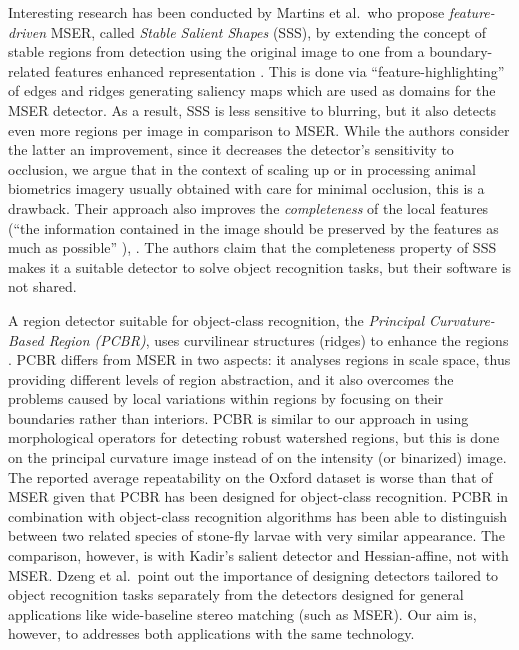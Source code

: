 \documentclass[conference,compsoc]{IEEEtran}
\begin{document}
Interesting research has been conducted by Martins et al.~who propose {\em feature-driven} MSER, called  {\em Stable Salient Shapes} (SSS), by extending the concept of stable regions from detection using the original image to one from a boundary-related features enhanced representation \cite{MartinsVisapp12, Martins12}. This is done via ``feature-highlighting'' of edges and ridges generating saliency maps which are used as domains for the MSER detector. As a result, SSS is less sensitive to blurring, but it also detects even more regions per image in comparison to MSER. While the authors consider the latter an improvement, since it decreases the detector's sensitivity to occlusion, we argue that in the context of scaling up or in processing animal biometrics imagery usually obtained with care for minimal occlusion, this is a drawback. Their approach also improves the {\em completeness} of the local features (``the information contained in the image should be preserved by the features as much as possible'' \cite{Dickscheid2011}), \cite{Martins2016OnTC}. The authors claim that the completeness property of SSS makes it a suitable detector to solve object recognition tasks, but their software is not shared.

A region detector suitable for object-class recognition, the {\em Principal Curvature-Based Region (PCBR)}, uses curvilinear structures (ridges) to enhance the regions \cite{DengZMDS07}. PCBR differs from MSER in two aspects: it analyses regions in scale space, thus providing different levels of region abstraction, and it also overcomes the problems caused by local variations within regions by focusing on their boundaries rather than interiors. PCBR is similar to our approach in using morphological operators for detecting robust watershed regions, but this is done on the principal curvature image instead of on the intensity (or binarized) image. The reported average repeatability on the Oxford dataset is worse than that of MSER given that PCBR has been designed for object-class recognition. PCBR in combination with object-class recognition algorithms has been able to distinguish between two related species of stone-fly larvae with very similar appearance. The comparison, however, is with Kadir's salient detector \cite{Kadir2004} and Hessian-affine, not with MSER.  Dzeng et al.~point out the importance of designing detectors tailored to object recognition tasks separately from the detectors designed for general applications like wide-baseline stereo matching (such as MSER). Our aim is, however, to addresses both applications with the same technology.
\end{document}
